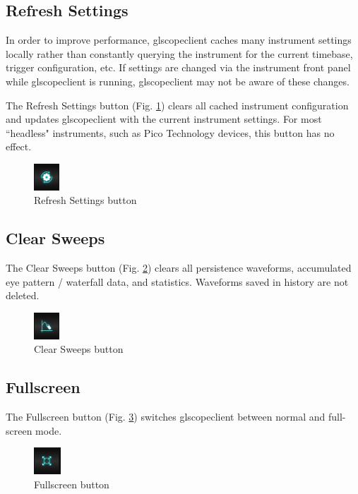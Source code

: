 \subsection{Refresh Settings}

In order to improve performance, glscopeclient caches many instrument settings locally rather than constantly querying
the instrument for the current timebase, trigger configuration, etc. If settings are changed via the instrument front
panel while glscopeclient is running, glscopeclient may not be aware of these changes.

The Refresh Settings button (Fig. \ref{refreshbutton}) clears all cached instrument configuration and updates
glscopeclient with the current instrument settings. For most ``headless" instruments, such as Pico Technology devices,
this button has no effect.

\begin{figure}[h]
\centering
\includegraphics[height=1cm]{images/refresh-button.png}
\caption{Refresh Settings button}
\label{refreshbutton}
\end{figure}

\subsection{Clear Sweeps}

The Clear Sweeps button (Fig. \ref{clearbutton}) clears all persistence waveforms, accumulated eye pattern / waterfall
data, and statistics. Waveforms saved in history are not deleted.

\begin{figure}[h]
\centering
\includegraphics[height=1cm]{images/clear-button.png}
\caption{Clear Sweeps button}
\label{clearbutton}
\end{figure}

\subsection{Fullscreen}

The Fullscreen button (Fig. \ref{fullscreenbutton}) switches glscopeclient between normal and full-screen mode.

\begin{figure}[h]
\centering
\includegraphics[height=1cm]{images/fullscreen-button.png}
\caption{Fullscreen button}
\label{fullscreenbutton}
\end{figure}

